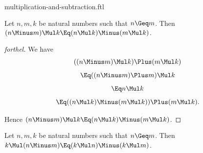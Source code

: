 \documentclass{stex}
\begin{document}
\begin{smodule}{multiplication-and-subtraction.ftl}


\begin{proposition*}[forthel]
  Let $n, m, k$ be natural numbers such that $n \Geq m$.
  Then $(n \Minus m) \Mul k \Eq (n \Mul k) \Minus (m \Mul k)$.
\end{proposition*}
\begin{proof}[forthel]
  We have
  \[  ((n \Minus m) \Mul k) \Plus (m \Mul k)                 \]
  \[    \Eq ((n \Minus m) \Plus m) \Mul k                       \]
  \[    \Eq n \Mul k                                   \]
  \[    \Eq ((n \Mul k) \Minus (m \Mul k)) \Plus (m \Mul k).  \]

  Hence $(n \Minus m) \Mul k \Eq (n \Mul k) \Minus (m \Mul k)$.
\end{proof}

\begin{proposition*}[forthel]
  Let $n, m, k$ be natural numbers such that $n \Geq m$.
  Then $k \Mul (n \Minus m) \Eq (k \Mul n) \Minus (k \Mul m)$.
\end{proposition*}

\end{smodule}
\end{document}
